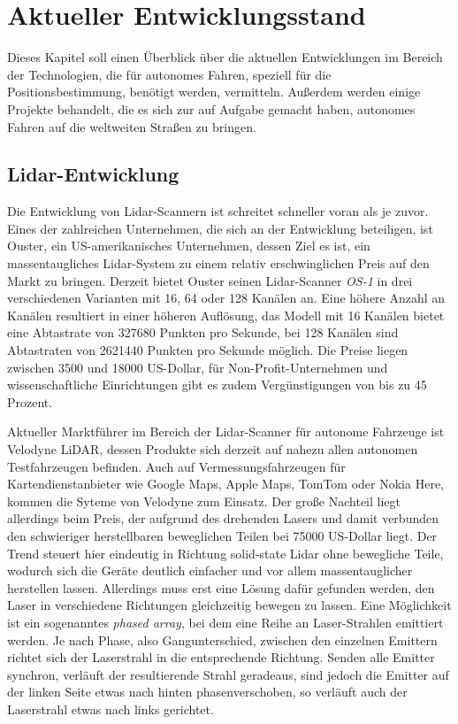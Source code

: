\chapter{Aktueller Entwicklungsstand}

Dieses Kapitel soll einen Überblick über die aktuellen Entwicklungen im Bereich der Technologien, die für autonomes Fahren, speziell für die Positionsbestimmung, benötigt werden, vermitteln. Außerdem werden einige Projekte behandelt, die es sich zur auf Aufgabe gemacht haben, autonomes Fahren auf die weltweiten Straßen zu bringen.


\section{\acs{Lidar}-Entwicklung}

Die Entwicklung von Lidar-Scannern ist schreitet schneller voran als je zuvor. Eines der zahlreichen Unternehmen, die sich an der Entwicklung beteiligen, ist Ouster, ein US-amerikanisches Unternehmen, dessen Ziel es ist, ein massentaugliches Lidar-System zu einem relativ erschwinglichen Preis auf den Markt zu bringen. Derzeit bietet Ouster seinen \acs{Lidar}-Scanner \emph{OS-1} in drei verschiedenen Varianten mit 16, 64 oder 128 Kanälen an. Eine höhere Anzahl an Kanälen resultiert in einer höheren Auflösung, das Modell mit 16 Kanälen bietet eine Abtastrate von \num{327680} Punkten pro Sekunde, bei 128 Kanälen sind Abtastraten von \num{2621440} Punkten pro Sekunde möglich. Die Preise liegen zwischen \num{3500} und \num{18000} US-Dollar, für Non-Profit-Unternehmen und wissenschaftliche Einrichtungen gibt es zudem Vergünstigungen von bis zu 45 Prozent. 

Aktueller Marktführer im Bereich der \acs{Lidar}-Scanner für autonome Fahrzeuge ist Velodyne LiDAR, dessen Produkte sich derzeit auf nahezu allen autonomen Testfahrzeugen befinden. Auch auf Vermessungsfahrzeugen für Kartendienstanbieter wie Google Maps, Apple Maps, TomTom oder Nokia Here, kommen die Syteme von Velodyne zum Einsatz. Der große Nachteil liegt allerdings beim Preis, der aufgrund des drehenden Lasers und damit verbunden den schwieriger herstellbaren beweglichen Teilen bei \num{75000} US-Dollar liegt. Der Trend steuert hier eindeutig in Richtung solid-state Lidar ohne bewegliche Teile, wodurch sich die Geräte deutlich einfacher und vor allem massentauglicher herstellen lassen. Allerdings muss erst eine Lösung dafür gefunden werden, den Laser in verschiedene Richtungen gleichzeitig bewegen zu lassen. Eine Möglichkeit ist ein sogenanntes \emph{phased array}, bei dem eine Reihe an Laser-Strahlen emittiert werden. Je nach Phase, also Gangunterschied, zwischen den einzelnen Emittern richtet sich der Laserstrahl in die entsprechende Richtung. Senden alle Emitter synchron, verläuft der resultierende Strahl geradeaus, sind jedoch die Emitter auf der linken Seite etwas nach hinten phasenverschoben, so verläuft auch der Laserstrahl etwas nach links gerichtet.


